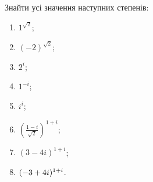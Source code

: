





\setcounter{section}{1}

\setcounter{problem}{73}
\begin{problem}
	Знайти усі значення наступних степенів:
	\begin{multicols}{4}
	\begin{enumerate}
		\item $1^{\sqrt{2}}$;
		\item $(-2)^{\sqrt{2}}$;
		\item $2^i$;
		\item $1^{-i}$;
		\item $i^i$;
		\item $\left( \frac{1-i}{\sqrt{2}} \right)^{1+i}$;
		\item $(3 - 4i)^{1+i}$;
		\item $(-3+\nobreak4i)^{1+i}$.
	\end{enumerate}
	\end{multicols}
\end{problem}
